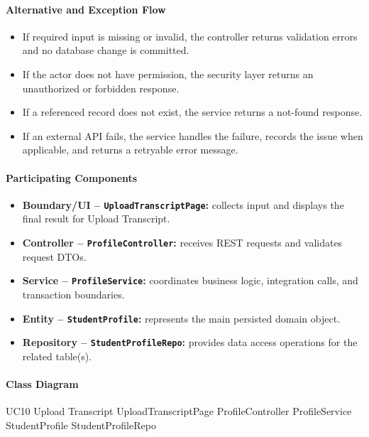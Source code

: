 \paragraph{Alternative and Exception Flow}

\begin{itemize}
    \item If required input is missing or invalid, the controller returns validation errors and no database change is committed.
    \item If the actor does not have permission, the security layer returns an unauthorized or forbidden response.
    \item If a referenced record does not exist, the service returns a not-found response.
    \item If an external API fails, the service handles the failure, records the issue when applicable, and returns a retryable error message.
\end{itemize}

\paragraph{Participating Components}

\begin{itemize}
    \item \textbf{Boundary/UI -- \texttt{UploadTranscriptPage}:} collects input and displays the final result for Upload Transcript.
    \item \textbf{Controller -- \texttt{ProfileController}:} receives REST requests and validates request DTOs.
    \item \textbf{Service -- \texttt{ProfileService}:} coordinates business logic, integration calls, and transaction boundaries.
    \item \textbf{Entity -- \texttt{StudentProfile}:} represents the main persisted domain object.
    \item \textbf{Repository -- \texttt{StudentProfileRepo}:} provides data access operations for the related table(s).
\end{itemize}

\paragraph{Class Diagram}

\ClassDiagram
{UC10 Upload Transcript}
{UploadTranscriptPage}
{ProfileController}
{ProfileService}
{StudentProfile}
{StudentProfileRepo}

